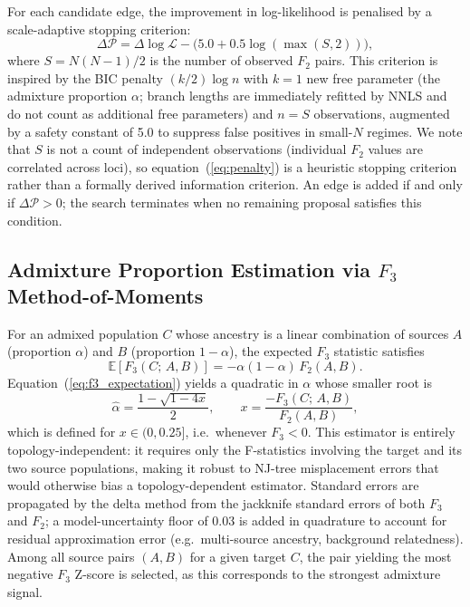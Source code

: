 For each candidate edge, the improvement in log-likelihood is penalised by a
scale-adaptive stopping criterion:
\begin{equation}
  \Delta\mathcal{P} = \Delta \log \mathcal{L}
                        - \bigl(5.0 + 0.5\log(\max(S,2))\bigr),
  \label{eq:penalty}
\end{equation}
where $S = N(N-1)/2$ is the number of observed $F_2$ pairs.
This criterion is inspired by the BIC penalty $(k/2)\log n$ with $k = 1$
new free parameter (the admixture proportion $\alpha$; branch lengths are
immediately refitted by NNLS and do not count as additional free parameters)
and $n = S$ observations, augmented by a safety constant of 5.0 to suppress
false positives in small-$N$ regimes.
We note that $S$ is not a count of independent observations (individual
$F_2$ values are correlated across loci), so equation~(\ref{eq:penalty})
is a heuristic stopping criterion rather than a formally derived information
criterion.
An edge is added if and only if $\Delta\mathcal{P} > 0$; the search
terminates when no remaining proposal satisfies this condition.

\subsection*{Admixture Proportion Estimation via $F_3$ Method-of-Moments}

For an admixed population $C$ whose ancestry is a linear combination of
sources $A$ (proportion $\alpha$) and $B$ (proportion $1-\alpha$), the
expected $F_3$ statistic satisfies \citep{Patterson2012}
\begin{equation}
  \mathbb{E}\!\left[F_3(C;\,A,B)\right] = -\alpha(1-\alpha)\,F_2(A,B).
  \label{eq:f3_expectation}
\end{equation}
Equation~(\ref{eq:f3_expectation}) yields a quadratic in $\alpha$ whose
smaller root is
\begin{equation}
  \hat{\alpha} = \frac{1 - \sqrt{1 - 4x}}{2},
  \qquad x = \frac{-F_3(C;\,A,B)}{F_2(A,B)},
  \label{eq:f3mom}
\end{equation}
which is defined for $x \in (0, 0.25]$, i.e.\ whenever $F_3 < 0$.
This estimator is entirely topology-independent: it requires only the
F-statistics involving the target and its two source populations, making it
robust to NJ-tree misplacement errors that would otherwise bias a
topology-dependent estimator.
Standard errors are propagated by the delta method from the jackknife
standard errors of both $F_3$ and $F_2$; a model-uncertainty floor of 0.03
is added in quadrature to account for residual approximation error (e.g.\
multi-source ancestry, background relatedness).
Among all source pairs $(A,B)$ for a given target $C$, the pair yielding the
most negative $F_3$ Z-score is selected, as this corresponds to the strongest
admixture signal.

